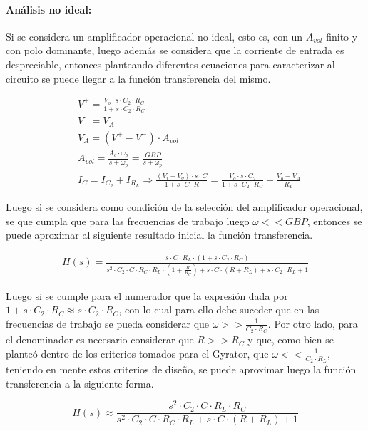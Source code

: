 \paragraph*{An\'alisis no ideal:} Si se considera un amplificador operacional no ideal, esto es, con un $A_{vol}$ finito y con polo dominante, luego adem\'as
se considera que la corriente de entrada es despreciable, entonces planteando diferentes ecuaciones para caracterizar al circuito se puede llegar a la funci\'on transferencia
del mismo.

\begin{align}
    & V^{+} = \frac{V_o \cdot s \cdot C_2 \cdot R_C}{1 + s \cdot C_2 \cdot R_C} \\
    & V^{-} = V_A \\
    & V_A = (V^{+} - V^{-}) \cdot A_{vol} \\
    & A_{vol} = \frac{A_o \cdot \omega_p}{s + \omega_p} = \frac{GBP}{s + \omega_p} \\
    & I_{C} = I_{C_2} + I_{R_L} \Rightarrow \frac{(V_i - V_o) \cdot s \cdot C}{1 + s \cdot C \cdot R} = \frac{V_o \cdot s \cdot C_2}{1 + s \cdot C_2 \cdot R_C} + \frac{V_o - V_A}{R_L}
\end{align}

Luego si se considera como condici\'on de la selecci\'on del amplificador operacional, se que cumpla que para las frecuencias de trabajo luego $\omega << GBP$, entonces se puede aproximar
al siguiente resultado inicial la funci\'on transferencia.

\begin{align}
    H(s) = \frac{s \cdot C \cdot R_L \cdot (1 + s \cdot C_2 \cdot R_C)}{s^{2} \cdot C_2 \cdot C \cdot R_C \cdot R_L \cdot (1 + \frac{R}{R_C}) + s \cdot C \cdot (R + R_L) + s \cdot C_2 \cdot R_L + 1}    
\end{align}

Luego si se cumple para el numerador que la expresi\'on dada por $1 + s \cdot C_2 \cdot R_C \approx s \cdot C_2 \cdot R_C$, con lo cual para ello debe suceder que en las frecuencias de trabajo
se pueda considerar que $\omega >> \frac{1}{C_2 \cdot R_C}$. Por otro lado, para el denominador es necesario considerar que $R >> R_C$ y que, como bien se plante\'o dentro de los criterios tomados para el Gyrator, que $\omega << \frac{1}{C_2 \cdot R_L}$, teniendo en mente
estos criterios de dise\~no, se puede aproximar luego la funci\'on transferencia a la siguiente forma.

\begin{equation}
    H(s) \approx \frac{s^{2} \cdot C_2 \cdot C \cdot R_L \cdot R_C}{s^{2} \cdot C_2 \cdot C \cdot R_C \cdot R_L + s \cdot C \cdot (R + R_L) + 1}
\end{equation}

